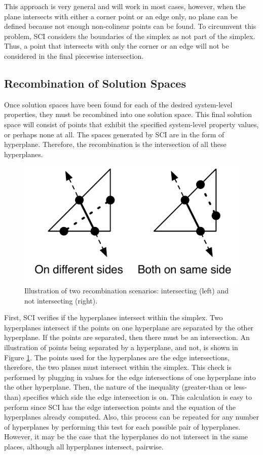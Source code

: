 This approach is very general and will work in most cases, however, when the plane intersects with either a corner point or an edge only, no plane can be defined because not enough non-colinear points can be found.
To circumvent this problem, SCI considers the boundaries of the simplex as not part of the simplex.
Thus, a point that intersects with only the corner or an edge will not be considered in the final piecewise intersection.

\subsection{Recombination of Solution Spaces}

Once solution spaces have been found for each of the desired system-level properties, they must be recombined into one solution space.
This final solution space will consist of points that exhibit the specified system-level property values, or perhaps none at all.
The spaces generated by SCI are in the form of hyperplane.
Therefore, the recombination is the intersection of all these hyperplanes.


\begin{figure}[ht]
\centering
\includegraphics[scale=1]{images/intcheck.pdf}
\caption{Illustration of two recombination scenarios: intersecting (left) and not intersecting (right).}
\label{fig:intcheck}
\end{figure}


First, SCI verifies if the hyperplanes intersect within the simplex.
Two hyperplanes intersect if the points on one hyperplane are separated by the other hyperplane.
If the points are separated, then there must be an intersection.
An illustration of points being separated by a hyperplane, and not, is shown in Figure \ref{fig:intcheck}.
The points used for the hyperplanes are the edge intersections, therefore, the two planes must intersect within the simplex.
This check is performed by plugging in values for the edge intersections of one hyperplane into the other hyperplane.
Then, the nature of the inequality (greater-than or less-than) specifies which side the edge intersection is on.
This calculation is easy to perform since SCI has the edge intersection points and the equation of the hyperplanes already computed.
Also, this process can be repeated for any number of hyperplanes by performing this test for each possible pair of hyperplanes.
However, it may be the case that the hyperplanes do not intersect in the same places, although all hyperplanes intersect, pairwise.


